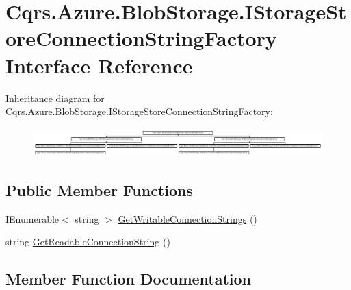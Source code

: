 \hypertarget{interfaceCqrs_1_1Azure_1_1BlobStorage_1_1IStorageStoreConnectionStringFactory}{}\section{Cqrs.\+Azure.\+Blob\+Storage.\+I\+Storage\+Store\+Connection\+String\+Factory Interface Reference}
\label{interfaceCqrs_1_1Azure_1_1BlobStorage_1_1IStorageStoreConnectionStringFactory}
Inheritance diagram for Cqrs.\+Azure.\+Blob\+Storage.\+I\+Storage\+Store\+Connection\+String\+Factory\+:\begin{figure}[H]
\begin{center}
\leavevmode
\includegraphics[height=1.115538cm]{interfaceCqrs_1_1Azure_1_1BlobStorage_1_1IStorageStoreConnectionStringFactory}
\end{center}
\end{figure}
\subsection*{Public Member Functions}
\begin{DoxyCompactItemize}
\item 
I\+Enumerable$<$ string $>$ \hyperlink{interfaceCqrs_1_1Azure_1_1BlobStorage_1_1IStorageStoreConnectionStringFactory_a26ecfd0805fe3d525e9fa419330bd140_a26ecfd0805fe3d525e9fa419330bd140}{Get\+Writable\+Connection\+Strings} ()
\item 
string \hyperlink{interfaceCqrs_1_1Azure_1_1BlobStorage_1_1IStorageStoreConnectionStringFactory_a0ed836289e048767f753630bbcc98d5d_a0ed836289e048767f753630bbcc98d5d}{Get\+Readable\+Connection\+String} ()
\end{DoxyCompactItemize}


\subsection{Member Function Documentation}
\mbox{\label{interfaceCqrs_1_1Azure_1_1BlobStorage_1_1IStorageStoreConnectionStringFactory_a0ed836289e048767f753630bbcc98d5d_a0ed836289e048767f753630bbcc98d5d}} 
